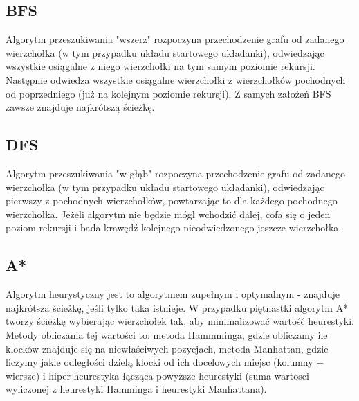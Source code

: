 \documentclass{classrep}
\begin{document}
\subsection{BFS}
Algorytm przeszukiwania "wszerz" rozpoczyna przechodzenie grafu od zadanego wierzchołka (w tym przypadku układu startowego układanki), odwiedzając wszystkie osiągalne z niego wierzchołki na tym samym poziomie rekursji. Następnie odwiedza wszystkie osiągalne wierzchołki z wierzchołków pochodnych od poprzedniego (już na kolejnym poziomie rekursji). Z samych założeń BFS zawsze znajduje najkrótszą ścieżkę.

\subsection{DFS}
Algorytm przeszukiwania "w głąb" rozpoczyna przechodzenie grafu od zadanego wierzchołka (w tym przypadku układu startowego układanki), odwiedzając pierwszy z pochodnych wierzchołków, powtarzając to dla każdego pochodnego wierzchołka. Jeżeli algorytm nie będzie mógł wchodzić dalej, cofa się o jeden poziom rekursji i bada krawędź kolejnego nieodwiedzonego jeszcze wierzchołka.

\subsection{A*}
Algorytm heurystyczny jest to algorytmem zupełnym i optymalnym - znajduje najkrótsza ścieżkę, jeśli tylko taka istnieje. W przypadku piętnastki algorytm A* tworzy ścieżkę wybierając wierzchołek tak, aby minimalizować wartość heurestyki. Metody obliczania tej wartości to: metoda Hammminga, gdzie obliczamy ile klocków znajduje się na niewłaściwych pozycjach, metoda Manhattan, gdzie liczymy jakie odległości dzielą klocki od ich docelowych miejsc (kolumny + wiersze) i hiper-heurestyka łącząca powyższe heurestyki (suma wartosci wyliczonej z heurestyki Hamminga i heurestyki Manhattana).
\end{document}
